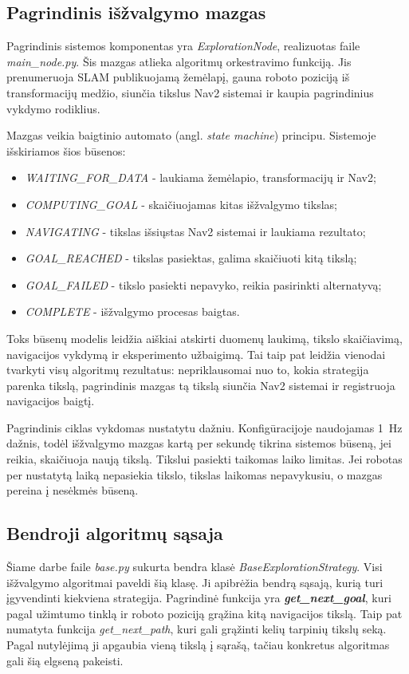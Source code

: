 \documentclass[]{VUMIFTemplateClass}
\begin{document}
\subsection{Pagrindinis išžvalgymo mazgas}

Pagrindinis sistemos komponentas yra \textit{ExplorationNode}, realizuotas faile \textit{main\_node.py}. Šis mazgas atlieka algoritmų orkestravimo funkciją.
Jis prenumeruoja SLAM publikuojamą žemėlapį, gauna roboto poziciją iš transformacijų medžio, siunčia tikslus Nav2 sistemai ir kaupia pagrindinius vykdymo
rodiklius.

Mazgas veikia baigtinio automato (angl. \textit{state machine}) principu. Sistemoje išskiriamos šios būsenos:
\begin{itemize}
  \item \textit{WAITING\_FOR\_DATA} - laukiama žemėlapio, transformacijų ir Nav2;
  \item \textit{COMPUTING\_GOAL} - skaičiuojamas kitas išžvalgymo tikslas;
  \item \textit{NAVIGATING} - tikslas išsiųstas Nav2 sistemai ir laukiama rezultato;
  \item \textit{GOAL\_REACHED} - tikslas pasiektas, galima skaičiuoti kitą tikslą;
  \item \textit{GOAL\_FAILED} - tikslo pasiekti nepavyko, reikia pasirinkti alternatyvą;
  \item \textit{COMPLETE} - išžvalgymo procesas baigtas.
\end{itemize}

Toks būsenų modelis leidžia aiškiai atskirti duomenų laukimą, tikslo skaičiavimą, navigacijos vykdymą ir eksperimento užbaigimą. Tai taip pat leidžia vienodai
tvarkyti visų algoritmų rezultatus: nepriklausomai nuo to, kokia strategija parenka tikslą, pagrindinis mazgas tą tikslą siunčia Nav2 sistemai ir registruoja
navigacijos baigtį.

Pagrindinis ciklas vykdomas nustatytu dažniu. Konfigūracijoje naudojamas 1~Hz dažnis, todėl išžvalgymo mazgas kartą per sekundę tikrina sistemos būseną,
jei reikia, skaičiuoja naują tikslą. Tikslui pasiekti taikomas laiko limitas. Jei robotas per nustatytą laiką nepasiekia tikslo,
tikslas laikomas nepavykusiu, o mazgas pereina į nesėkmės būseną.

\subsection{Bendroji algoritmų sąsaja}

Šiame darbe faile \textit{base.py} sukurta bendra klasė \textit{BaseExplorationStrategy}. Visi išžvalgymo algoritmai paveldi šią klasę. Ji apibrėžia bendrą sąsają, kurią turi įgyvendinti kiekviena
strategija. Pagrindinė funkcija yra \textbf{\textit{get\_next\_goal}}, kuri pagal užimtumo tinklą ir roboto poziciją grąžina kitą navigacijos tikslą. Taip pat numatyta
funkcija \textit{get\_next\_path}, kuri gali grąžinti kelių tarpinių tikslų seką. Pagal nutylėjimą ji apgaubia vieną tikslą į sąrašą, tačiau konkretus
algoritmas gali šią elgseną pakeisti.
\end{document}
